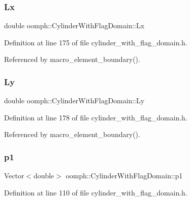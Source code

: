 \subsubsection{\texorpdfstring{Lx}{Lx}}
{\footnotesize\ttfamily double oomph\+::\+Cylinder\+With\+Flag\+Domain\+::\+Lx\hspace{0.3cm}{\ttfamily [private]}}



Definition at line 175 of file cylinder\+\_\+with\+\_\+flag\+\_\+domain.\+h.



Referenced by macro\+\_\+element\+\_\+boundary().

\mbox{\label{classoomph_1_1CylinderWithFlagDomain_a733fc387ee7d25811edb6b99c796b242}} 
\subsubsection{\texorpdfstring{Ly}{Ly}}
{\footnotesize\ttfamily double oomph\+::\+Cylinder\+With\+Flag\+Domain\+::\+Ly\hspace{0.3cm}{\ttfamily [private]}}



Definition at line 178 of file cylinder\+\_\+with\+\_\+flag\+\_\+domain.\+h.



Referenced by macro\+\_\+element\+\_\+boundary().

\mbox{\label{classoomph_1_1CylinderWithFlagDomain_a22098b556345f035ddacbdf9ea1f7076}} 
\subsubsection{\texorpdfstring{p1}{p1}}
{\footnotesize\ttfamily Vector$<$double$>$ oomph\+::\+Cylinder\+With\+Flag\+Domain\+::p1\hspace{0.3cm}{\ttfamily [private]}}



Definition at line 110 of file cylinder\+\_\+with\+\_\+flag\+\_\+domain.\+h.



